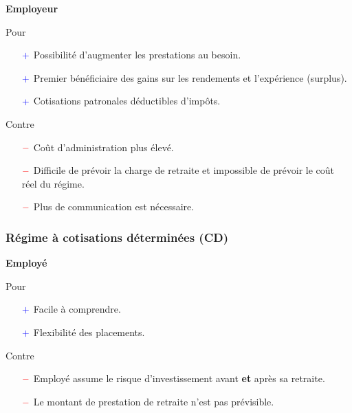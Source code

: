 \documentclass[10pt, french]{article}
\begin{document}
\begin{multicols*}{3}
\begin{center}
	\textbf{Employeur}
\end{center}
Pour
\begin{itemize}
	\item[$\color{blue}+$]	Possibilité d'augmenter les prestations au besoin.
	\item[$\color{blue}+$]	Premier bénéficiaire des gains sur les rendements et l'expérience (surplus).
	\item[$\color{blue}+$]	Cotisations patronales déductibles d'impôts.
\end{itemize}

Contre
\begin{itemize}
	\item[$\color{red}-$]	Coût d'administration plus élevé.
	\item[$\color{red}-$]	Difficile de prévoir la charge de retraite et impossible de prévoir le coût réel du régime.
	\item[$\color{red}-$]	Plus de communication est nécessaire.
\end{itemize}

\subsubsection*{Régime à cotisations déterminées (CD)}
\begin{center}
	\textbf{Employé}
\end{center}
Pour
\begin{itemize}
	\item[$\color{blue}+$]	Facile à comprendre.
	\item[$\color{blue}+$]	Flexibilité des placements.
\end{itemize}


Contre
\begin{itemize}
	\item[$\color{red}-$]	Employé assume le risque d'investissement avant \textbf{et} après sa retraite.
	\item[$\color{red}-$]	Le montant de prestation de retraite n'est pas prévisible.
\end{itemize}


\end{multicols*}
\end{document}
